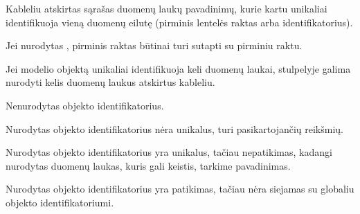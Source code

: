 \documentclass[letterpaper,10pt,lithuanian]{sphinxmanual}
\begin{document}
\begin{fulllineitems}
\label{\detokenize{dimensijos:model.ref}}
\pysigstartsignatures
\pysigline
{}
\pysigstopsignatures
\sphinxAtStartPar
Kableliu atskirtas sąrašas {\hyperref[\detokenize{dimensijos:model.property}]{}} duomenų laukų pavadinimų,
kurie kartu unikaliai identifikuoja vieną duomenų eilutę (pirminis lentelės
raktas arba identifikatorius).

\sphinxAtStartPar
Jei nurodytas {\hyperref[\detokenize{dimensijos:model.type}]{}}, pirminis raktas būtinai turi sutapti su
{\hyperref[\detokenize{dimensijos:model.type}]{}} pirminiu raktu.

\sphinxAtStartPar
Jei modelio objektą unikaliai identifikuoja keli duomenų laukai,
{\hyperref[\detokenize{dimensijos:model.ref}]{}} stulpelyje galima nurodyti kelis duomenų laukus atskirtus
kableliu.

\begin{sphinxtopic}
\begin{description}
\sphinxAtStartPar
Nenurodytas objekto identifikatorius.

\sphinxAtStartPar
Nurodytas objekto identifikatorius nėra unikalus, turi
pasikartojančių reikšmių.

\sphinxAtStartPar
Nurodytas objekto identifikatorius yra unikalus, tačiau
nepatikimas, kadangi nurodytas duomenų laukas, kuris gali keistis,
tarkime pavadinimas.

\sphinxAtStartPar
Nurodytas objekto identifikatorius yra patikimas, tačiau nėra
siejamas su globaliu objekto identifikatoriumi.

\end{description}
\end{sphinxtopic}

\end{fulllineitems}
\end{document}
